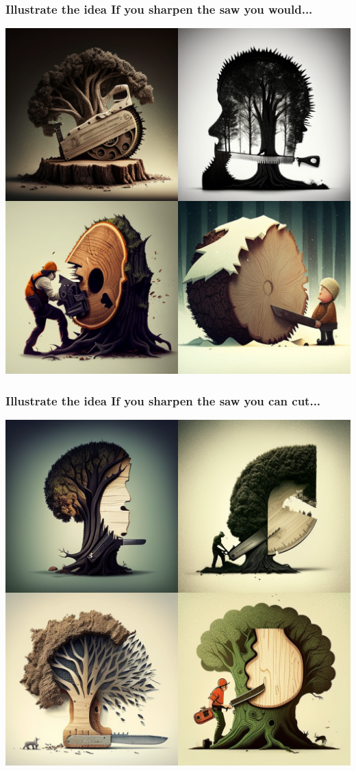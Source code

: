 \documentclass[9pt,table,xcolor=dvipsnames]{beamer}%
\theoremstyle{definition}
\theoremstyle{plain}
\begin{document}
\begin{frame}[fragile,t] %
  \frametitle{Illustrate the idea If you sharpen the saw you would...}
  \begin{center}
    \includegraphics[scale=0.22]{./figs/chenle02_Illustrate_the_idea_If_you_sharpen_the_saw_you_would.png}
  \end{center}
\end{frame}
\begin{frame}[fragile,t] %
  \frametitle{Illustrate the idea If you sharpen the saw you can cut...}
  \begin{center}
    \includegraphics[scale=0.22]{./figs/chenle02_illustrate_the_idea_If_you_sharpen_the_saw_you_can_cut.png}
  \end{center}
\end{frame}
\end{document}
